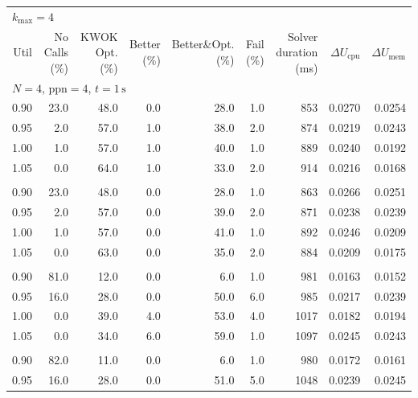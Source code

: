 \begin{table}[t]
\tiny
\setlength{\tabcolsep}{3.5pt}
\renewcommand{\arraystretch}{0.95}
\centering
\begin{tabular}{r r r r r r r r r}
\toprule
\multicolumn{9}{l}{$k_{\max}=4$} \\
\addlinespace[0.2em]
Util & No Calls (\%) & KWOK Opt. (\%) & Better (\%) & \makecell{Better\&Opt.\\(\%)} & Fail (\%) & \makecell{Solver\\duration (ms)} & $\Delta U_{\mathrm{cpu}}$ & $\Delta U_{\mathrm{mem}}$ \\
\midrule
\multicolumn{9}{l}{$N=4$, $\mathrm{ppn}=4$, $t=1\,\mathrm{s}$} \\
\midrule
0.90 & 23.0 & 48.0 & 0.0 & 28.0 & 1.0 & 853 & 0.0270 & 0.0254 \\
0.95 & 2.0 & 57.0 & 1.0 & 38.0 & 2.0 & 874 & 0.0219 & 0.0243 \\
1.00 & 1.0 & 57.0 & 1.0 & 40.0 & 1.0 & 889 & 0.0240 & 0.0192 \\
1.05 & 0.0 & 64.0 & 1.0 & 33.0 & 2.0 & 914 & 0.0216 & 0.0168 \\
\addlinespace[0.35em]
\multicolumn{9}{l}{$N=4$, $\mathrm{ppn}=4$, $t=10\,\mathrm{s}$} \\
\midrule
0.90 & 23.0 & 48.0 & 0.0 & 28.0 & 1.0 & 863 & 0.0266 & 0.0251 \\
0.95 & 2.0 & 57.0 & 0.0 & 39.0 & 2.0 & 871 & 0.0238 & 0.0239 \\
1.00 & 1.0 & 57.0 & 0.0 & 41.0 & 1.0 & 892 & 0.0246 & 0.0209 \\
1.05 & 0.0 & 63.0 & 0.0 & 35.0 & 2.0 & 884 & 0.0209 & 0.0175 \\
\addlinespace[0.35em]
\multicolumn{9}{l}{$N=4$, $\mathrm{ppn}=8$, $t=1\,\mathrm{s}$} \\
\midrule
0.90 & 81.0 & 12.0 & 0.0 & 6.0 & 1.0 & 981 & 0.0163 & 0.0152 \\
0.95 & 16.0 & 28.0 & 0.0 & 50.0 & 6.0 & 985 & 0.0217 & 0.0239 \\
1.00 & 0.0 & 39.0 & 4.0 & 53.0 & 4.0 & 1017 & 0.0182 & 0.0194 \\
1.05 & 0.0 & 34.0 & 6.0 & 59.0 & 1.0 & 1097 & 0.0245 & 0.0243 \\
\addlinespace[0.35em]
\multicolumn{9}{l}{$N=4$, $\mathrm{ppn}=8$, $t=10\,\mathrm{s}$} \\
\midrule
0.90 & 82.0 & 11.0 & 0.0 & 6.0 & 1.0 & 980 & 0.0172 & 0.0161 \\
0.95 & 16.0 & 28.0 & 0.0 & 51.0 & 5.0 & 1048 & 0.0239 & 0.0245 \\

\end{tabular}
\end{table}
